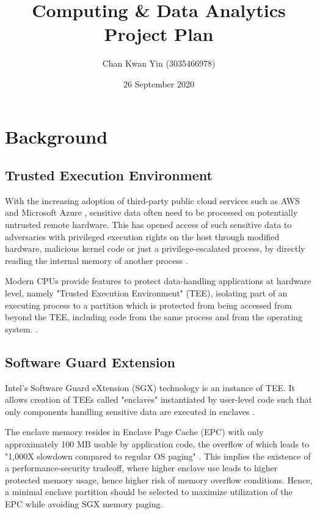 \documentclass[a4paper, 10pt]{article}
\title{Computing \& Data Analytics Project Plan}
\author{Chan Kwan Yin (3035466978)}
\date{26 September 2020}
\begin{document}
\maketitle

\tableofcontents

\section{Background}
\subsection{Trusted Execution Environment}
With the increasing adoption of third-party public cloud services
such as AWS \cite{aws} and Microsoft Azure \cite{azure},
sensitive data often need to be processed on potentially untrusted remote hardware.
This has opened access of such sensitive data
to adversaries with privileged execution rights on the host
through modified hardware, malicious kernel code or just a privilege-escalated process,
by directly reading the internal memory of another process
\cite{ReadProcessMemory} \cite{linuxprocmem}.

Modern CPUs provide features to protect data-handling applications at hardware level,
namely "Trusted Execution Environment" (TEE),
isolating part of an executing process to a partition
which is protected from being accessed from beyond the TEE,
including code from the same process and from the operating system.
\cite{AtamliReinehAhmad2017Affa}.

\subsection{Software Guard Extension}
Intel's Software Guard eXtension (SGX) technology
is an instance of TEE.
It allows creation of TEEs called "enclaves" instantiated by user-level code
such that only components handling sensitive data are executed in enclaves
\cite{AtamliReinehAhmad2017Affa}.

The enclave memory resides in Enclave Page Cache (EPC)
with only approximately 100 MB usable by application code,
the overflow of which leads to "1,000X slowdown compared to regular OS paging" \cite{uranus}.
This implies the existence of a performance-security tradeoff,
where higher enclave use leads to higher protected memory usage,
hence higher risk of memory overflow conditions.
Hence, a minimal enclave partition should be selected
to maximize utilization of the EPC while avoiding SGX memory paging.
\end{document}
